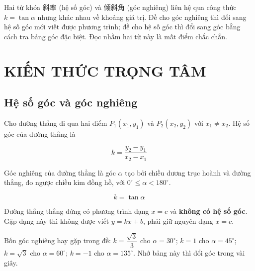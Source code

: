 \documentclass[11pt, a4paper]{article}
\begin{document}
 Hai từ khóa 斜率 (hệ số góc) và 倾斜角 (góc nghiêng) liên hệ qua công thức $k = \tan\alpha$ nhưng khác nhau về khoảng giá trị. Đề cho góc nghiêng thì đổi sang hệ số góc mới viết được phương trình; đề cho hệ số góc thì đổi sang góc bằng cách tra bảng góc đặc biệt. Đọc nhầm hai từ này là mất điểm chắc chắn.

\section{KIẾN THỨC TRỌNG TÂM}

\subsection{Hệ số góc và góc nghiêng}

\begin{dinhnghia}[{1 — Hệ số góc}]
Cho đường thẳng đi qua hai điểm $P_1(x_1, y_1)$ và $P_2(x_2, y_2)$ với $x_1 \ne x_2$. Hệ số góc của đường thẳng là

$$k = \frac{y_2 - y_1}{x_2 - x_1}$$
\end{dinhnghia}
\begin{dinhnghia}
Góc nghiêng của đường thẳng là góc $\alpha$ tạo bởi chiều dương trục hoành và đường thẳng, đo ngược chiều kim đồng hồ, với $0^\circ \le \alpha < 180^\circ$.
\end{dinhnghia}
\begin{dinhly}
$$k = \tan\alpha$$


 Đường thẳng thẳng đứng có phương trình dạng $x = c$ và \textbf{không có hệ số góc}. Gặp dạng này thì không được viết $y = kx + b$, phải giữ nguyên dạng $x = c$.

 Bốn góc nghiêng hay gặp trong đề: $k = \dfrac{\sqrt{3}}{3}$ cho $\alpha = 30^\circ$; $k = 1$ cho $\alpha = 45^\circ$; $k = \sqrt{3}$ cho $\alpha = 60^\circ$; $k = -1$ cho $\alpha = 135^\circ$. Nhớ bảng này thì đổi góc trong vài giây.
\end{dinhly}
\end{document}
